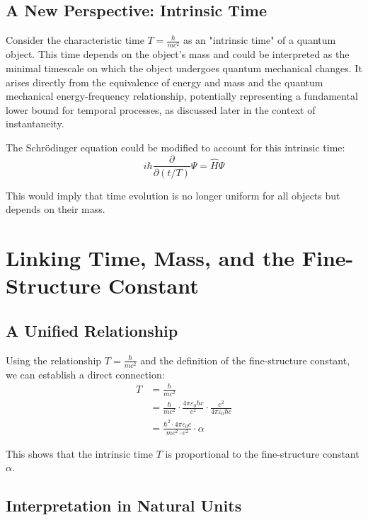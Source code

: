 \documentclass{article}
\begin{document}
	\subsection{A New Perspective: Intrinsic Time}
	
	Consider the characteristic time $T = \frac{\hbar}{mc^2}$ as an "intrinsic time" of a quantum object. This time depends on the object's mass and could be interpreted as the minimal timescale on which the object undergoes quantum mechanical changes. It arises directly from the equivalence of energy and mass and the quantum mechanical energy-frequency relationship, potentially representing a fundamental lower bound for temporal processes, as discussed later in the context of instantaneity.
	
	The Schrödinger equation could be modified to account for this intrinsic time:
	\begin{equation}
		i\hbar \frac{\partial}{\partial (t/T)}\Psi = \hat{H}\Psi
	\end{equation}
	
	This would imply that time evolution is no longer uniform for all objects but depends on their mass.
	
	\section{Linking Time, Mass, and the Fine-Structure Constant}
	
	\subsection{A Unified Relationship}
	
	Using the relationship $T = \frac{\hbar}{mc^2}$ and the definition of the fine-structure constant, we can establish a direct connection:
	\begin{align}
		T &= \frac{\hbar}{mc^2} \\
		&= \frac{\hbar}{mc^2} \cdot \frac{4\pi\varepsilon_0\hbar c}{e^2} \cdot \frac{e^2}{4\pi\varepsilon_0\hbar c} \\
		&= \frac{\hbar^2 \cdot 4\pi\varepsilon_0 c}{mc^2 \cdot e^2} \cdot \alpha
	\end{align}
	
	This shows that the intrinsic time $T$ is proportional to the fine-structure constant $\alpha$.
	
	\subsection{Interpretation in Natural Units}
	
\end{document}
